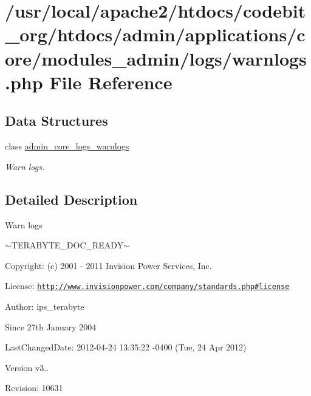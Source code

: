 \hypertarget{warnlogs_8php}{\section{/usr/local/apache2/htdocs/codebit\-\_\-org/htdocs/admin/applications/core/modules\-\_\-admin/logs/warnlogs.php File Reference}
\label{warnlogs_8php}
}
\subsection*{Data Structures}
\begin{DoxyCompactItemize}
\item 
class \hyperlink{classadmin__core__logs__warnlogs}{admin\-\_\-core\-\_\-logs\-\_\-warnlogs}
\begin{DoxyCompactList}\small\item\em Warn logs. \end{DoxyCompactList}\end{DoxyCompactItemize}


\subsection{Detailed Description}
\begin{DoxyVerb}  Warn logs
\end{DoxyVerb}
 $\sim$\-T\-E\-R\-A\-B\-Y\-T\-E\-\_\-\-D\-O\-C\-\_\-\-R\-E\-A\-D\-Y$\sim$ \begin{DoxyParagraph}{Copyright\-:}
(c) 2001 -\/ 2011 Invision Power Services, Inc.
\end{DoxyParagraph}
\begin{DoxyParagraph}{License\-:}
\href{http://www.invisionpower.com/company/standards.php#license}{\tt http\-://www.\-invisionpower.\-com/company/standards.\-php\#license}
\end{DoxyParagraph}
\begin{DoxyParagraph}{Author\-:}
ips\-\_\-terabyte 
\end{DoxyParagraph}
\begin{DoxySince}{Since}
27th January 2004 
\end{DoxySince}
\begin{DoxyParagraph}{Last\-Changed\-Date\-:}
2012-\/04-\/24 13\-:35\-:22 -\/0400 (Tue, 24 Apr 2012) 
\end{DoxyParagraph}
\begin{DoxyVersion}{Version}
v3.. 
\end{DoxyVersion}
\begin{DoxyParagraph}{Revision\-:}
10631 
\end{DoxyParagraph}
